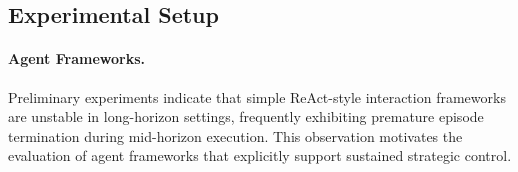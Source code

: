 






\subsection{Experimental Setup}

\paragraph{Agent Frameworks.}

Preliminary experiments indicate that simple ReAct-style interaction frameworks are unstable in long-horizon settings, frequently exhibiting premature episode termination during mid-horizon execution. This observation motivates the evaluation of agent frameworks that explicitly support sustained strategic control.

